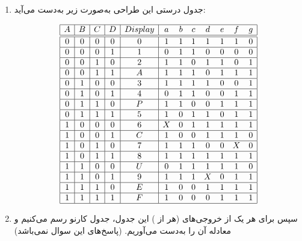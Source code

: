 \begin{enumerate}
	\item 
	جدول درستی این طراحی به‌صورت زیر به‌دست می‌آید:
	
	\begin{latin}
		\[
		\begin{array}{|c|c|c|c|c|c c c c c c c|}
			\hline
			A & B & C & D & Display & a & b & c & d & e & f & g \\
			\hline\hline      %
			0 & 0 & 0 & 0 & 0 & 1 & 1 & 1 & 1 & 1 & 1 & 0 \\
            \hline
			0 & 0 & 0 & 1 & 1 & 0 & 1 & 1 & 0 & 0 & 0 & 0 \\
            \hline
			0 & 0 & 1 & 0 & 2 & 1 & 1 & 0 & 1 & 1 & 0 & 1 \\
            \hline
			0 & 0 & 1 & 1 & A & 1 & 1 & 1 & 0 & 1 & 1 & 1 \\
            \hline
			0 & 1 & 0 & 0 & 3 & 1 & 1 & 1 & 1 & 0 & 0 & 1 \\
            \hline
			0 & 1 & 0 & 1 & 4 & 0 & 1 & 1 & 0 & 0 & 1 & 1 \\
            \hline
			0 & 1 & 1 & 0 & P & 1 & 1 & 0 & 0 & 1 & 1 & 1 \\
            \hline
			0 & 1 & 1 & 1 & 5 & 1 & 0 & 1 & 1 & 0 & 1 & 1 \\
            \hline
			1 & 0 & 0 & 0 & 6 & X & 0 & 1 & 1 & 1 & 1 & 1 \\
            \hline
			1 & 0 & 0 & 1 & C & 1 & 0 & 0 & 1 & 1 & 1 & 0 \\
            \hline
			1 & 0 & 1 & 0 & 7 & 1 & 1 & 1 & 0 & 0 & X & 0 \\
            \hline
			1 & 0 & 1 & 1 & 8 & 1 & 1 & 1 & 1 & 1 & 1 & 1 \\
            \hline
			1 & 1 & 0 & 0 & U & 0 & 1 & 1 & 1 & 1 & 1 & 0 \\
            \hline
			1 & 1 & 0 & 1 & 9 & 1 & 1 & 1 & X & 0 & 1 & 1 \\
            \hline
			1 & 1 & 1 & 0 & E & 1 & 0 & 0 & 1 & 1 & 1 & 1 \\
            \hline
			1 & 1 & 1 & 1 & F & 1 & 0 & 0 & 0 & 1 & 1 & 1 \\
			\hline
		\end{array}
		\]
	\end{latin}
	
	
	
	\item 
	سپس برای هر یک از خروجی‌های (هر  از ) این جدول، جدول کارنو رسم می‌کنیم و معادله آن را به‌دست می‌آوریم. (پاسخ‌های این سوال  نمی‌باشد)
	

\end{enumerate}
